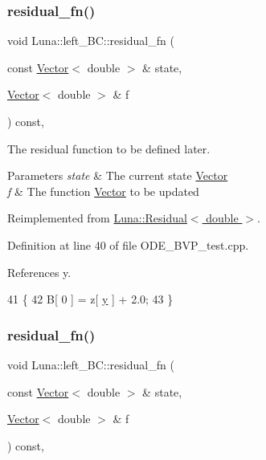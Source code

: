 \subsubsection{\texorpdfstring{residual\+\_\+fn()}{residual\_fn()}\hspace{0.1cm}{\footnotesize\ttfamily [1/2]}}
{\footnotesize\ttfamily void Luna\+::left\+\_\+\+B\+C\+::residual\+\_\+fn (\begin{DoxyParamCaption}\item[{const \hyperlink{classLuna_1_1Vector}{Vector}$<$ double $>$ \&}]{state,  }\item[{\hyperlink{classLuna_1_1Vector}{Vector}$<$ double $>$ \&}]{f }\end{DoxyParamCaption}) const\hspace{0.3cm}{\ttfamily [inline]}, {\ttfamily [virtual]}}



The residual function to be defined later. 


\begin{DoxyParams}{Parameters}
{\em state} & The current state \hyperlink{classLuna_1_1Vector}{Vector} \\
\hline
{\em f} & The function \hyperlink{classLuna_1_1Vector}{Vector} to be updated \\
\hline
\end{DoxyParams}


Reimplemented from \hyperlink{classLuna_1_1Residual_ae1b1ebe3314c788b176bcac7b328de5c}{Luna\+::\+Residual$<$ double $>$}.



Definition at line 40 of file O\+D\+E\+\_\+\+B\+V\+P\+\_\+test.\+cpp.



References y.


\begin{DoxyCode}
41         \{
42             B[ 0 ] = z[ \hyperlink{ODE__BVP__test_8cpp_adf764cbdea00d65edcd07bb9953ad2b7ae1f9fdb8b786c63efc4ce44eeacd17f2}{y} ] + 2.0;
43         \}
\end{DoxyCode}
\mbox{\label{classLuna_1_1left__BC_a01645de89a78c7c925d60bb68e994c90}} 
\subsubsection{\texorpdfstring{residual\+\_\+fn()}{residual\_fn()}\hspace{0.1cm}{\footnotesize\ttfamily [2/2]}}
{\footnotesize\ttfamily void Luna\+::left\+\_\+\+B\+C\+::residual\+\_\+fn (\begin{DoxyParamCaption}\item[{const \hyperlink{classLuna_1_1Vector}{Vector}$<$ double $>$ \&}]{state,  }\item[{\hyperlink{classLuna_1_1Vector}{Vector}$<$ double $>$ \&}]{f }\end{DoxyParamCaption}) const\hspace{0.3cm}{\ttfamily [inline]}, {\ttfamily [virtual]}}



